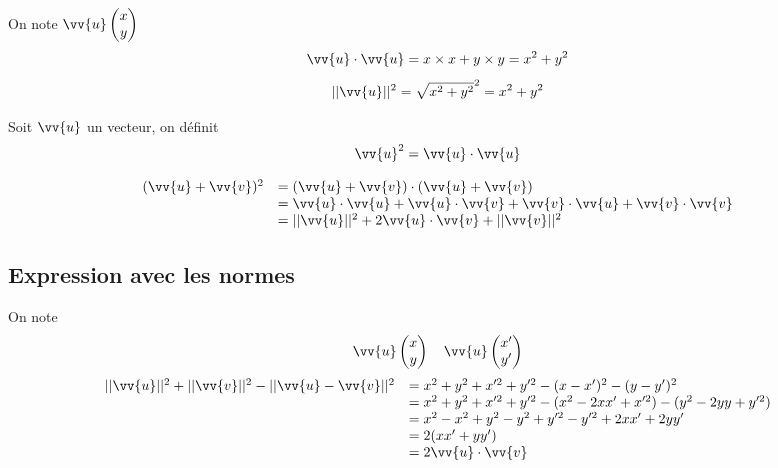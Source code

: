 \begin{preuve}
On note $\vv{u}\covec{x}{y}$
$$\vv{u}\cdot\vv{u} = x\times x+y\times y = x^2+y^2$$
$$||\vv{u}||^2 = \sqrt{x^2+y^2}^2 = x^2+y^2$$
\end{preuve}
Soit $\vv{u}$ un vecteur, on définit 
$$\vv{u}^2 = \vv{u}\cdot\vv{u}$$
\newline

\begin{preuve}
$$
\begin{array}{l l}
(\vv{u} + \vv{v})^2 &= (\vv{u} + \vv{v})\cdot(\vv{u}+\vv{v})\\
&=\vv{u}\cdot\vv{u} + \vv{u}\cdot\vv{v} + \vv{v}\cdot\vv{u} +\vv{v}\cdot\vv{v}\\
&=||\vv{u}||^2 + 2\vv{u}\cdot\vv{v} + ||\vv{v}||^2\\
\end{array}
$$
\end{preuve}
\subsection{Expression avec les normes}
\newline

\begin{preuve}
On note $$\vv{u} \covec{x}{y} \quad \vv{u} \covec{x'}{y'}$$ 
$$
\begin{array}{l l}
||\vv{u}||^2 + ||\vv{v}||^2 - ||\vv{u} - \vv{v}||^2 &= x^2+y^2 + x'^2 + y'^2 -(x-x')^2 -(y-y')^2\\
& = x^2+y^2 + x'^2 + y'^2 -(x^2-2xx' + x'^2) -(y^2-2yy+y'^2 )\\
& = x^2 - x^2 + y^2 -y^2 +y'^2-y'^2 + 2xx' + 2yy'\\
&= 2(xx'+yy')\\
&= 2\vv{u}\cdot\vv{v}
\end{array}
$$
\end{preuve}
